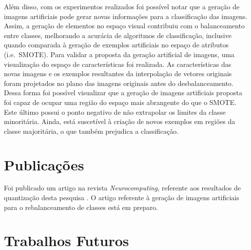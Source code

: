 Além disso, com os experimentos realizados foi possível notar que a geração de imagens artificiais pode gerar novas informações para a classificação das imagens. Assim, a geração de elementos no espaço visual contribuiu com o balanceamento entre classes, melhorando a acurácia de algoritmos de classificação, inclusive quando comparada à geração de exemplos artificiais no espaço de atributos (i.e.\ SMOTE). Para validar a proposta da geração artificial de imagens, uma visualização do espaço de características foi realizada. As características das novas imagens e os exemplos resultantes da interpolação de vetores originais foram projetados no plano das imagens originais antes do desbalanceamento. Dessa forma foi possível visualizar que a geração de imagens artificiais proposta foi capaz de ocupar uma região do espaço mais abrangente do que o SMOTE. Este último possui o ponto negativo de não extrapolar os limites da classe minoritária. Ainda, está suscetível à criação de novos exemplos em regiões da classe majoritária, o que também prejudica a classificação.

\section{Publicações}

Foi publicado um artigo na revista \textit{Neurocomputing}, referente aos resultados de quantização desta pesquisa \cite{Ponti2016}. O artigo referente à geração de imagens artificiais para o rebalanceamento de classes está em preparo.


\section{Trabalhos Futuros}



